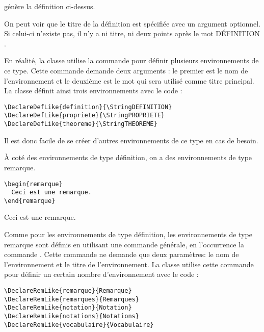 \documentclass[nocrop]{sesamanuel}
\begin{document}
génère la définition ci-dessus.
\begin{remarque}
On peut voir que le titre de la définition est spécifiée avec un
argument optionnel. Si celui-ci n'existe pas, il n'y a ni titre, ni
 deux points après le mot \og DÉFINITION \fg{}.

En réalité, la classe utilise la commande  pour
définir plusieurs environnements de ce type. Cette commande demande
deux arguments : le premier est le nom de l'environnement et le
deuxième est le mot qui sera utilisé comme titre principal. La classe
définit ainsi trois environnements avec le code :
\begin{verbatim}
\DeclareDefLike{definition}{\StringDEFINITION}
\DeclareDefLike{propriete}{\StringPROPRIETE}
\DeclareDefLike{theoreme}{\StringTHEOREME}
\end{verbatim}
Il est donc facile de se créer d'autres environnements de ce type en
cas de besoin.
\end{remarque}

\renewcommand{\StringDOCUMENTATION}{Remarque}
\begin{documentation}
À coté des environnements de type définition, on a des environnements
de type remarque.
\end{documentation}
\begin{code}
\begin{verbatim}
\begin{remarque}
  Ceci est une remarque.
\end{remarque}
\end{verbatim}
\end{code}
\begin{result}
 
\end{result}

\begin{remarque}
  Ceci est une remarque.
\end{remarque}

Comme pour les environnements de type définition, les environnements
de type remarque sont définis en utilisant une commande générale, en
l'occurrence la commande . Cette commande ne
demande que deux paramètres: le nom de l'environnement et le titre de
l'environnement. La classe utilise cette commande pour définir un
certain nombre d'environnement avec le code :
\begin{verbatim}
\DeclareRemLike{remarque}{Remarque}
\DeclareRemLike{remarques}{Remarques}
\DeclareRemLike{notation}{Notation}
\DeclareRemLike{notations}{Notations}
\DeclareRemLike{vocabulaire}{Vocabulaire}
\end{verbatim}
\end{document}
